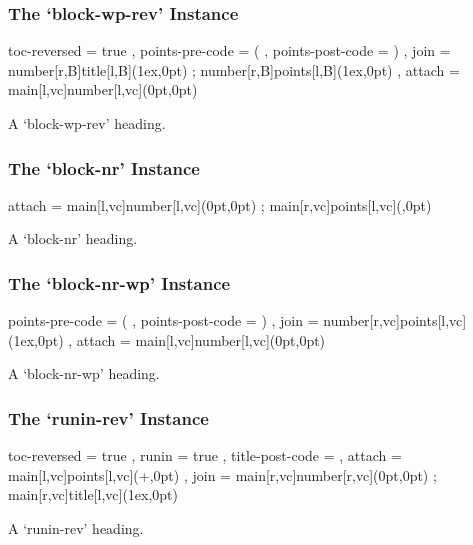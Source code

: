 \documentclass[DIV10,toc=index,toc=bib,numbers=noendperiod]{cnpkgdoc}
\begin{document}
\subsubsection{The `block-wp-rev' Instance}
\begin{beispiel}
  {
    toc-reversed     = true ,
    points-pre-code  = ( ,
    points-post-code = ) ,
    join             =
      {
        number[r,B]title[l,B](1ex,0pt) ;
        number[r,B]points[l,B](1ex,0pt)
      } ,
    attach           = { main[l,vc]number[l,vc](0pt,0pt) }
  }
\end{beispiel}
\begin{question}{1}
 A `block-wp-rev' heading. \sample
\end{question}

\subsubsection{The `block-nr' Instance}
\begin{beispiel}
  {
    attach           =
      {
        main[l,vc]number[l,vc](0pt,0pt) ;
        main[r,vc]points[l,vc](\marginparsep,0pt)
      }
  }
\end{beispiel}
\begin{question}{1}
 A `block-nr' heading. \sample
\end{question}

\subsubsection{The `block-nr-wp' Instance}
\begin{beispiel}
  {
    points-pre-code  = ( ,
    points-post-code = ) ,
    join             = { number[r,vc]points[l,vc](1ex,0pt) } ,
    attach           = { main[l,vc]number[l,vc](0pt,0pt) }
  }
\end{beispiel}
\begin{question}{1}
 A `block-nr-wp' heading. \sample
\end{question}

\subsubsection{The `runin-rev' Instance}
\begin{beispiel}
  {
    toc-reversed     = true ,
    runin            = true ,
    title-post-code  = \space ,
    attach           =
      { main[l,vc]points[l,vc](\linewidth+\marginparsep,0pt) } ,
    join             =
      {
        main[r,vc]number[r,vc](0pt,0pt) ;
        main[r,vc]title[l,vc](1ex,0pt)
      }
  }
\end{beispiel}
\begin{question}{1}
 A `runin-rev' heading. \sample
\end{question}
\end{document}
